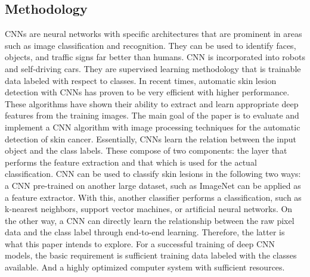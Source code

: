 \documentclass[twocolumn]{article}
\begin{document}
\subsection{Methodology}
CNNs are neural networks with specific architectures that are prominent in areas such as image classification and recognition. They can be used to identify faces, objects, and traffic signs far better than humans. CNN is incorporated into robots and self-driving cars. They are supervised learning methodology that is trainable data labeled with respect to classes. 
In recent times, automatic skin lesion detection with CNNs has proven to be very efficient with higher performance. These algorithms have shown their ability to extract and learn appropriate deep features from the training images. The main goal of the paper is to evaluate and implement a CNN algorithm with image processing techniques for the automatic detection of skin cancer.
Essentially, CNNs learn the relation between the input object and the class labels. These compose of two components: the layer that performs the feature extraction and that which is used for the actual classification. 
CNN can be used to classify skin lesions in the following two ways: a CNN pre-trained on another large dataset, such as ImageNet can be applied as a feature extractor. With this, another classifier performs a classification, such as k-nearest neighbors, support vector machines, or artificial neural networks.  On the other way, a CNN can directly learn the relationship between the raw pixel data and the class label through end-to-end learning. Therefore, the latter is what this paper intends to explore. For a successful training of deep CNN models, the basic requirement is sufficient training data labeled with the classes available. And a highly optimized computer system with sufficient resources.
\end{document}
